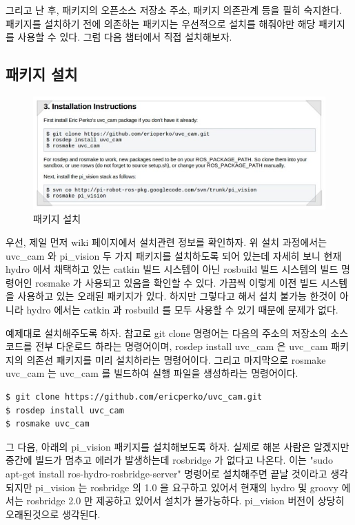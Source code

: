 그리고 난 후, 패키지의 오픈소스 저장소 주소, 패키지 의존관계 등을 필히 숙지한다. 패키지를 설치하기 전에 의존하는 패키지는 우선적으로 설치를 해줘야만 해당 패키지를 사용할 수 있다. 그럼 다음 챕터에서 직접 설치해보자.

\subsection{패키지 설치}

\begin{figure}[h]
\centering\includegraphics[width=0.9\columnwidth]{pictures/chapter8/openpkg4.jpg}
\caption{패키지 설치}
\end{figure}

우선, 제일 먼저 wiki 페이지에서 설치관련 정보를 확인하자. 위 설치 과정에서는 uvc\_cam 와 pi\_vision 두 가지 패키지를 설치하도록 되어 있는데 자세히 보니 현재 hydro 에서 채택하고 있는 catkin 빌드 시스템이 아닌 rosbuild 빌드 시스템의 빌드 명령어인 rosmake 가 사용되고 있음을 확인할 수 있다. 가끔씩 이렇게 이전 빌드 시스템을 사용하고 있는 오래된 패키지가 있다. 하지만 그렇다고 해서 설치 불가능 한것이 아니라 hydro 에서는 catkin 과 rosbuild 를 모두 사용할 수 있기 때문에 문제가 없다.

예제대로 설치해주도록 하자. 참고로 git clone 명령어는 다음의 주소의 저장소의 소스코드를 전부 다운로드 하라는 명령어이며, rosdep install uvc\_cam 은 uvc\_cam 패키지의 의존선 패키지를 미리 설치하라는 명령어이다. 그리고 마지막으로 rosmake uvc\_cam 는 uvc\_cam 를 빌드하여 실행 파일을 생성하라는 명령어이다.

\begin{lstlisting}[language=ROS]
$ git clone https://github.com/ericperko/uvc_cam.git
$ rosdep install uvc_cam
$ rosmake uvc_cam
\end{lstlisting}

그 다음, 아래의 pi\_vision 패키지를 설치해보도록 하자. 실제로 해본 사람은 알겠지만 중간에 빌드가 멈추고 에러가 발생하는데 rosbridge 가 없다고 나온다.  이는 "sudo apt-get install ros-hydro-rosbridge-server" 명령어로 설치해주면 끝날 것이라고 생각되지만 pi\_vision 는 rosbridge 의 1.0 을 요구하고 있어서 현재의 hydro 및 groovy 에서는 rosbridge 2.0 만 제공하고 있어서 설치가 불가능하다. pi\_vision 버전이 상당히 오래된것으로 생각된다.

